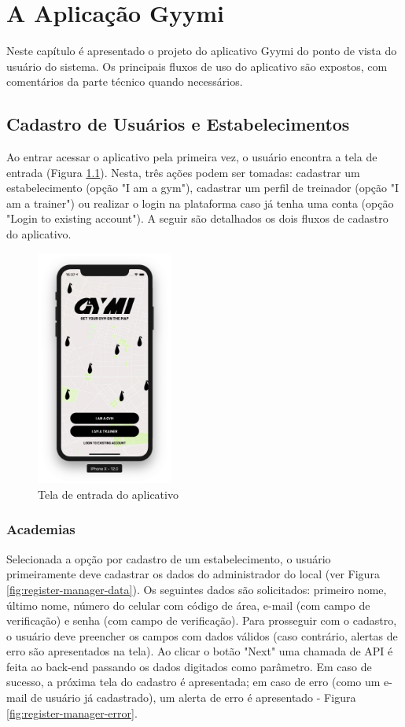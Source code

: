 \chapter{A Aplicação Gyymi} \label{cap:gyymi}
Neste capítulo é apresentado o projeto do aplicativo Gyymi do ponto de vista do usuário do sistema. Os principais fluxos de uso do aplicativo são expostos, com comentários da parte técnico quando necessários.

\section{Cadastro de Usuários e Estabelecimentos}
Ao entrar acessar o aplicativo pela primeira vez, o usuário encontra a tela de entrada (Figura \ref{fig:landing}). Nesta, três ações podem ser tomadas: cadastrar um estabelecimento (opção "I am a gym"), cadastrar um perfil de treinador (opção "I am a trainer") ou realizar o login na plataforma caso já tenha uma conta (opção "Login to existing account"). A seguir são detalhados os dois fluxos de cadastro do aplicativo.
\begin{figure}[H]
    \centering
    \includegraphics[width=0.4\textwidth]{pfc/figuras/landing.png}
    \caption{Tela de entrada do aplicativo}
    \label{fig:landing}
\end{figure}

\subsection{Academias} \label{sec:register-gym}
Selecionada a opção por cadastro de um estabelecimento, o usuário primeiramente deve cadastrar os dados do administrador do local (ver Figura \ref{fig:register-manager-data}). Os seguintes dados são solicitados: primeiro nome, último nome, número do celular com código de área, e-mail (com campo de verificação) e senha (com campo de verificação). Para prosseguir com o cadastro, o usuário deve preencher os campos com dados válidos (caso contrário, alertas de erro são apresentados na tela). Ao clicar o botão "Next" uma chamada de API é feita ao back-end passando os dados digitados como parâmetro. Em caso de sucesso, a próxima tela do cadastro é apresentada; em caso de erro (como um e-mail de usuário já cadastrado), um alerta de erro é apresentado - Figura \ref{fig:register-manager-error}.

